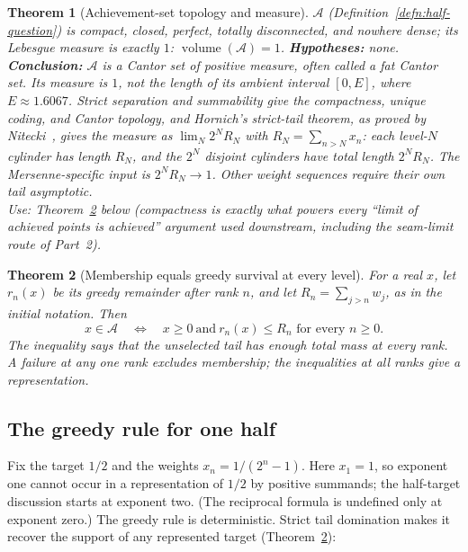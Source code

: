 \documentclass[11pt]{article}
\theoremstyle{plain}
\newtheorem{thm}{Theorem}[section]
\theoremstyle{definition}
\theoremstyle{remark}
\begin{document}
\begin{thm}[Achievement-set topology and measure]
\label{thm:topology}
$\mathcal{A}$ (Definition~\ref{defn:half-question}) is compact, closed, perfect, totally
disconnected, and nowhere dense; its Lebesgue measure is exactly $1$:
$\operatorname{volume}(\mathcal{A}) = 1$. \textbf{Hypotheses:} none. \textbf{Conclusion:}
$\mathcal A$ is a Cantor set of positive measure, often called a
fat Cantor set.  Its measure is $1$, not the length of its ambient
interval $[0,E]$, where $E\approx1.6067$.
Strict separation and summability give the compactness, unique coding, and Cantor topology, and
Hornich's strict-tail theorem, as proved by Nitecki~\cite[Theorem~4(1), p.~9]{nitecki2013}, gives
the measure as $\lim_N2^NR_N$ with $R_N=\sum_{n>N}x_n$: each level-$N$ cylinder has length $R_N$,
and the $2^N$ disjoint cylinders have total length $2^NR_N$. The Mersenne-specific input is
$2^NR_N\to1$. Other weight sequences require their own tail asymptotic.\\
\textit{Use:} Theorem~\ref{thm:greedy-survival-record} below (compactness is exactly what powers
every ``limit of achieved points is achieved'' argument used downstream, including the seam-limit
route of Part~2).
\end{thm}

\begin{thm}[Membership equals greedy survival at every level]
\label{thm:greedy-survival-record}
For a real $x$, let $r_n(x)$ be its greedy remainder after rank $n$,
and let $R_n=\sum_{j>n}w_j$, as in the initial notation.  Then
\[
 x\in\mathcal A\quad\Longleftrightarrow\quad
 x\ge0\ \text{and}\ r_n(x)\le R_n\text{ for every }n\ge0.
\]
The inequality says that the unselected tail has enough total mass
at every rank.  A failure at any one rank excludes membership;
the inequalities at all ranks give a representation.
\end{thm}

\subsection{The greedy rule for one half}
\label{ssec:greedy-orbit}

Fix the target $1/2$ and the weights $x_n = 1/(2^n-1)$. Here $x_1=1$, so exponent one cannot occur
in a representation of $1/2$ by positive summands; the half-target discussion starts at exponent
two. (The reciprocal formula is undefined only at exponent zero.) The greedy
rule is deterministic.  Strict tail domination makes it recover the
support of any represented target
(Theorem~\ref{thm:greedy-survival-record}):
\end{document}
